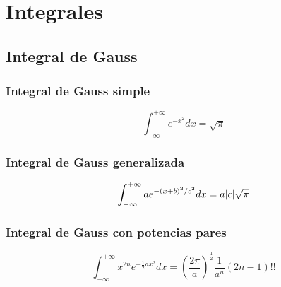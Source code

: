 \section{Integrales}\label{sec:integrales}
\subsection{Integral de Gauss}\label{subsec:integral-de-gauss}
\subsubsection*{Integral de Gauss simple}
\begin{equation}
    \label{eq:integral-gauss}
    \int_{-\infty}^{+\infty} e^{-x^{2}}dx =\sqrt{\pi}
\end{equation}

\subsubsection*{Integral de Gauss generalizada}
\begin{equation}
    \label{eq:integral-gauss-generalizada}
    \int_{-\infty}^{+\infty} ae^{-(x+b)^{2}/c^2}dx =a\lvert c\rvert\sqrt{\pi}
\end{equation}

\subsubsection*{Integral de Gauss con potencias pares}
\begin{equation}
    \label{eq:integral-gauss-generalizada-potencias-pares}
    \int_{-\infty}^{+\infty} x^{2n}e^{-\frac{1}{2}ax^{2}}dx =\left(\frac{2\pi}{a}\right)^{\frac{1}{2}}\frac{1}{a^n}(2n-1)!!
\end{equation}
